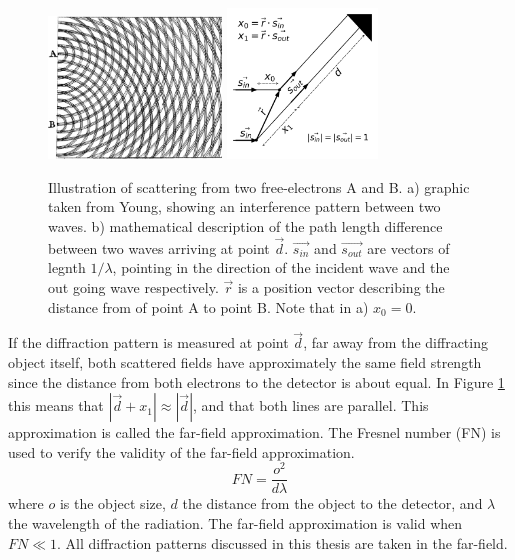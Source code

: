\begin{figure}[h]
\centering 
\includegraphics[width=46mm]{Young_Diffraction2.png}
\includegraphics[width=40mm]{blah.png}
\label{fig:Interference}
\caption{Illustration of scattering from two free-electrons A and B. a) graphic taken from Young, showing an interference pattern between two waves. b) mathematical description of the path length difference between two waves arriving at point $\vec{d}$. $\vec{s_{in}}$ and $\vec{s_{out}}$ are vectors of legnth $1/\lambda$, pointing in the direction of the incident wave and the out going wave respectively. $\vec{r}$ is a position vector describing the distance from of point A to point B. Note that in a) $x_0 = 0$.}
\end{figure}

If the diffraction pattern is measured at point \(\vec{d}\), far away from the diffracting object itself, both scattered fields have approximately the same field strength since the distance from both electrons to the detector is about equal. In Figure \ref{fig:Interference} this means that  $|\vec{d}+x_1| \approx |\vec{d}|$, and that both lines are parallel. This approximation is called the far-field approximation. The Fresnel number (FN) is used to verify the validity of the far-field approximation.
\begin{equation} 
FN = \frac{o^2}{d\lambda}
\end{equation}
where $o$ is the object size, $d$ the distance from the
object to the detector, and \(\lambda\) the
wavelength of the radiation. The far-field approximation is valid when $FN \ll 1$. All diffraction patterns discussed
in this thesis are taken in the far-field. 

